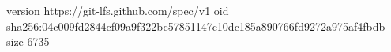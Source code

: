 version https://git-lfs.github.com/spec/v1
oid sha256:04c009fd2844cf09a9f322bc57851147c10dc185a890766fd9272a975af4fbdb
size 6735
